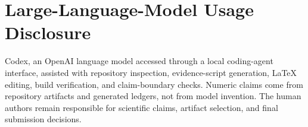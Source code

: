 \section{Large-Language-Model Usage Disclosure}
\label{app:llm}

Codex, an OpenAI language model accessed through a local coding-agent
interface, assisted with repository inspection, evidence-script generation,
LaTeX editing, build verification, and claim-boundary checks. Numeric claims
come from repository artifacts and generated ledgers, not from model
invention. The human authors remain responsible for scientific claims,
artifact selection, and final submission decisions.
